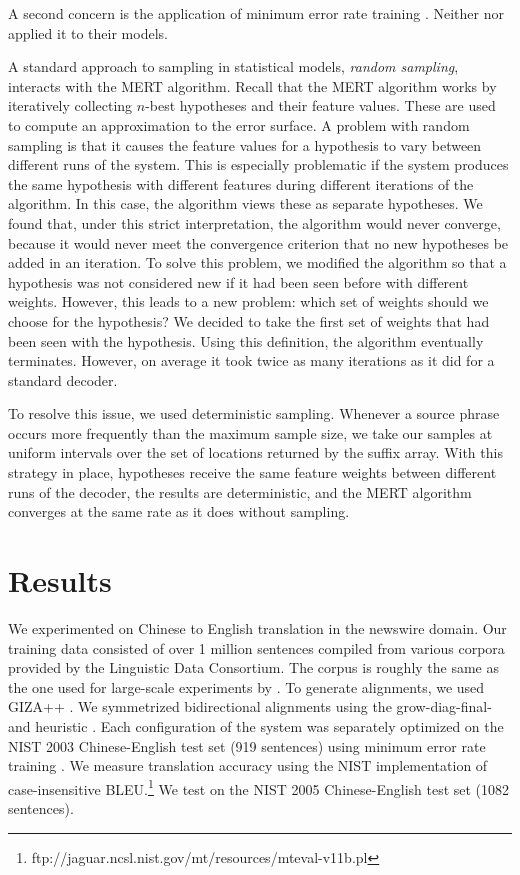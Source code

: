 A second concern is the application of minimum error rate training
\cite[MERT,][\textsection\ref{sec:minimum-error-rate-training}]{Och:2003:acl}.
Neither \citet{Callison-Burch:2005:acl} nor \citet{Zhang:2005:eamt}
applied it to their models.

A standard approach to sampling in statistical models, 
{\em random sampling}, interacts with the MERT algorithm.  Recall
that the MERT algorithm works by iteratively collecting $n$-best
hypotheses and their feature values.  These are used to compute 
an approximation to the error surface.  A problem with random
sampling is that it causes the feature values for a hypothesis 
to vary between different runs of the system.  This is especially
problematic if the system produces the same hypothesis with different
features during different iterations of the algorithm.  In this
case, the algorithm views these as separate hypotheses.  We found
that, under this strict interpretation, the algorithm would never
converge, because it would never meet the convergence criterion
that no new hypotheses be added in an iteration.  To solve this
problem, we modified the algorithm so that a hypothesis was
not considered new if it had been seen before with different weights.
However, this leads to a new problem: which set of weights should
we choose for the hypothesis?  We decided to take the first set
of weights that had been seen with the hypothesis.  Using this
definition, the algorithm eventually terminates. However, on average
it took twice as many iterations as it did for a standard decoder.

To resolve this issue, we used deterministic sampling.
Whenever a source phrase occurs more frequently than the maximum sample
size, we take our samples at uniform intervals over the set
of locations returned by the suffix array.  With this strategy
in place, hypotheses receive the same feature weights between different
runs of the decoder, the results are deterministic, and the MERT
algorithm converges at the same rate as it does without sampling.

\section{Results}\label{sec:overview-results}

We experimented on Chinese to English translation
in the newswire domain.  Our training data consisted 
of over 1 million sentences compiled from various corpora
provided by the Linguistic Data Consortium.  The corpus is roughly the same as the
one used for large-scale experiments by \citet{Chiang:2005:hlt}.
To generate alignments, we used GIZA++ \citep{Och:2003:cl}.
We symmetrized bidirectional alignments using the grow-diag-final-and
heuristic \citep{Koehn:2003:naacl}.  Each configuration of the system was
separately optimized on the NIST 2003 
Chinese-English test set (919 sentences) using
minimum error rate training 
\citep[\textsection\ref{sec:minimum-error-rate-training}]{Och:2003:acl}. 
We measure translation accuracy using the NIST implementation
of case-insensitive BLEU.\footnote{ftp://jaguar.ncsl.nist.gov/mt/resources/mteval-v11b.pl}
We test on the NIST 2005 Chinese-English test set (1082 sentences).

